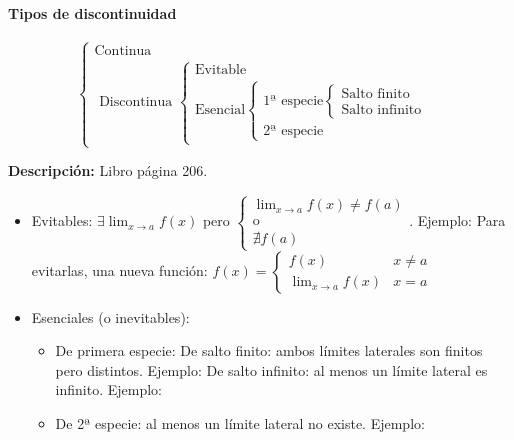 \paragraph{Tipos de discontinuidad}

\[
\begin{cases} 
	\text{Continua}\\
	\text{ Discontinua }
		\begin{cases}
			\text{Evitable}\\
			\text{Esencial}
				\begin{cases}
					\text{1ª especie}
						\begin{cases}
							\text{Salto finito}\\
							\text{Salto infinito}
						\end{cases}\\
					\text{2ª especie}
				\end{cases}
		\end{cases}
\end{cases}
\]


\textbf{Descripción: } Libro  página 206.
\begin{itemize}
	\item Evitables: $\exists \displaystyle\lim_{x\to a}f(x)$ pero $\begin{cases}\displaystyle\lim_{x\to a}f(x) \neq f(a)\\\text{o}\\\nexists f(a)\end{cases}$. Ejemplo: 
	\subitem Para evitarlas, \quad\quad\quad\quad una nueva función: $f(x) = \begin{cases}f(x) & x\neq a\\ \displaystyle\lim_{x\to a}f(x) & x=a \end{cases}$
	\item Esenciales (o inevitables): 
	\begin{itemize}
		\item De primera especie:
		\subitem De salto finito: ambos límites laterales son finitos pero distintos. Ejemplo:
		\subitem De salto infinito: al menos un límite lateral es infinito. Ejemplo:
		\item De 2ª especie: al menos un límite lateral no existe. Ejemplo:
	\end{itemize}
\end{itemize}


